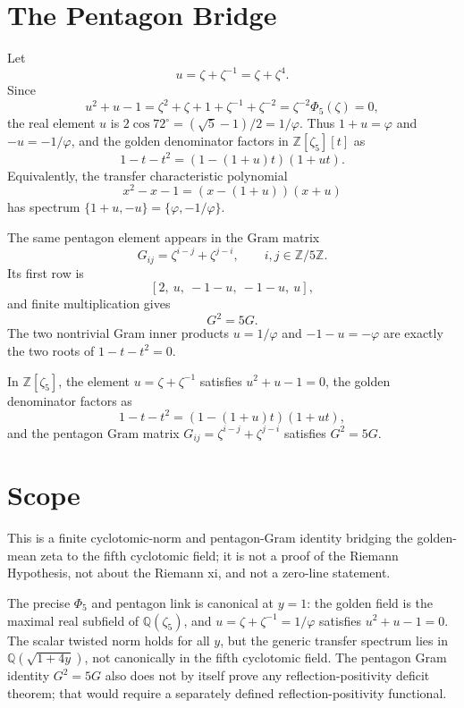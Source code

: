 \section{The Pentagon Bridge}
\label{sec:window6-golden-mean-pentagon-bridge}

Let
$$
u=\zeta+\zeta^{-1}=\zeta+\zeta^4.
$$
Since
$$
u^2+u-1=\zeta^2+\zeta+1+\zeta^{-1}+\zeta^{-2}
=\zeta^{-2}\Phi_5(\zeta)=0,
$$
the real element $u$ is $2\cos 72^\circ=(\sqrt5-1)/2=1/\varphi$.  Thus $1+u=\varphi$ and $-u=-1/\varphi$, and the golden denominator factors in $\mathbb Z[\zeta_5][t]$ as
$$
1-t-t^2=(1-(1+u)t)(1+ut).
$$
Equivalently, the transfer characteristic polynomial
$$
x^2-x-1=(x-(1+u))(x+u)
$$
has spectrum $\{1+u,-u\}=\{\varphi,-1/\varphi\}$.

The same pentagon element appears in the Gram matrix
$$
G_{ij}=\zeta^{i-j}+\zeta^{j-i},
\qquad i,j\in\mathbb Z/5\mathbb Z.
$$
Its first row is
$$
[2,\ u,\ -1-u,\ -1-u,\ u],
$$
and finite multiplication gives
$$
G^2=5G.
$$
The two nontrivial Gram inner products $u=1/\varphi$ and $-1-u=-\varphi$ are exactly the two roots of $1-t-t^2=0$.

\begin{theorem}
\label{thm:window6-golden-mean-pentagon-gram}
In $\mathbb Z[\zeta_5]$, the element $u=\zeta+\zeta^{-1}$ satisfies $u^2+u-1=0$, the golden denominator factors as
$$
1-t-t^2=(1-(1+u)t)(1+ut),
$$
and the pentagon Gram matrix $G_{ij}=\zeta^{i-j}+\zeta^{j-i}$ satisfies $G^2=5G$.
\end{theorem}

\section{Scope}
\label{sec:window6-golden-mean-cyclotomic-scope}

This is a finite cyclotomic-norm and pentagon-Gram identity bridging the golden-mean zeta to the fifth cyclotomic field; it is not a proof of the Riemann Hypothesis, not about the Riemann xi, and not a zero-line statement.

The precise $\Phi_5$ and pentagon link is canonical at $y=1$: the golden field is the maximal real subfield of $\mathbb Q(\zeta_5)$, and $u=\zeta+\zeta^{-1}=1/\varphi$ satisfies $u^2+u-1=0$.  The scalar twisted norm holds for all $y$, but the generic transfer spectrum lies in $\mathbb Q(\sqrt{1+4y})$, not canonically in the fifth cyclotomic field.  The pentagon Gram identity $G^2=5G$ also does not by itself prove any reflection-positivity deficit theorem; that would require a separately defined reflection-positivity functional.

